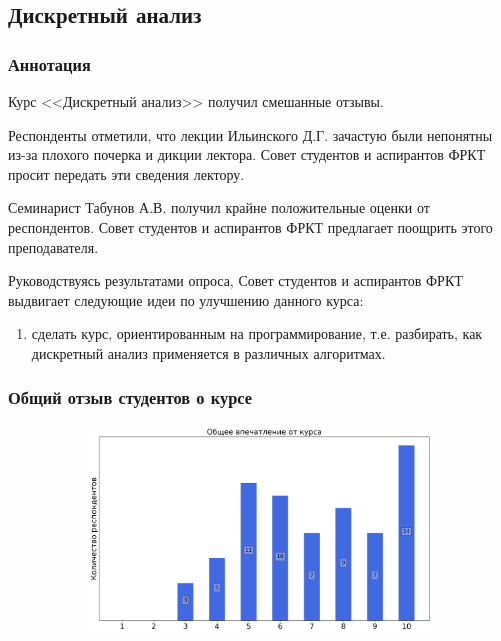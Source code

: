 \subsection{Дискретный анализ}
	
	\subsubsection{Аннотация}

	    Курс <<Дискретный анализ>> получил смешанные отзывы. 
        
        Респонденты отметили, что лекции Ильинского Д.Г. зачастую были непонятны из-за плохого почерка и дикции лектора. Совет студентов и аспирантов ФРКТ просит передать эти сведения лектору.

        Семинарист Табунов А.В. получил крайне положительные оценки от респондентов. Совет студентов и аспирантов ФРКТ предлагает поощрить этого преподавателя.

        Руководствуясь результатами опроса, Совет студентов и аспирантов ФРКТ выдвигает следующие идеи по улучшению данного курса:
        \begin{enumerate}
            \item сделать курс, ориентированным на программирование, т.е. разбирать, как дискретный анализ применяется в различных алгоритмах.
        \end{enumerate}


	\subsubsection{Общий отзыв студентов о курсе}

		\begin{figure}[H]
			\centering
			\begin{subfigure}[b]{0.45\textwidth}
				\centering
				\includegraphics[width=\textwidth]{images/1 course/Дискретный анализ/general-0.png}
			\end{subfigure}
		\end{figure}


